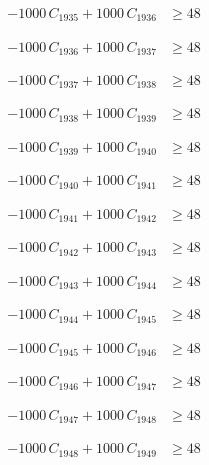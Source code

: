 \documentclass[a4paper,11pt]{article}
\begin{document}
\begin{align}
-1000\,C_{1935} + 1000\,C_{1936} &\geq 48 \nonumber
\end{align}

\begin{align}
-1000\,C_{1936} + 1000\,C_{1937} &\geq 48 \nonumber
\end{align}

\begin{align}
-1000\,C_{1937} + 1000\,C_{1938} &\geq 48 \nonumber
\end{align}

\begin{align}
-1000\,C_{1938} + 1000\,C_{1939} &\geq 48 \nonumber
\end{align}

\begin{align}
-1000\,C_{1939} + 1000\,C_{1940} &\geq 48 \nonumber
\end{align}

\begin{align}
-1000\,C_{1940} + 1000\,C_{1941} &\geq 48 \nonumber
\end{align}

\begin{align}
-1000\,C_{1941} + 1000\,C_{1942} &\geq 48 \nonumber
\end{align}

\begin{align}
-1000\,C_{1942} + 1000\,C_{1943} &\geq 48 \nonumber
\end{align}

\begin{align}
-1000\,C_{1943} + 1000\,C_{1944} &\geq 48 \nonumber
\end{align}

\begin{align}
-1000\,C_{1944} + 1000\,C_{1945} &\geq 48 \nonumber
\end{align}

\begin{align}
-1000\,C_{1945} + 1000\,C_{1946} &\geq 48 \nonumber
\end{align}

\begin{align}
-1000\,C_{1946} + 1000\,C_{1947} &\geq 48 \nonumber
\end{align}

\begin{align}
-1000\,C_{1947} + 1000\,C_{1948} &\geq 48 \nonumber
\end{align}

\begin{align}
-1000\,C_{1948} + 1000\,C_{1949} &\geq 48 \nonumber
\end{align}
\end{document}
